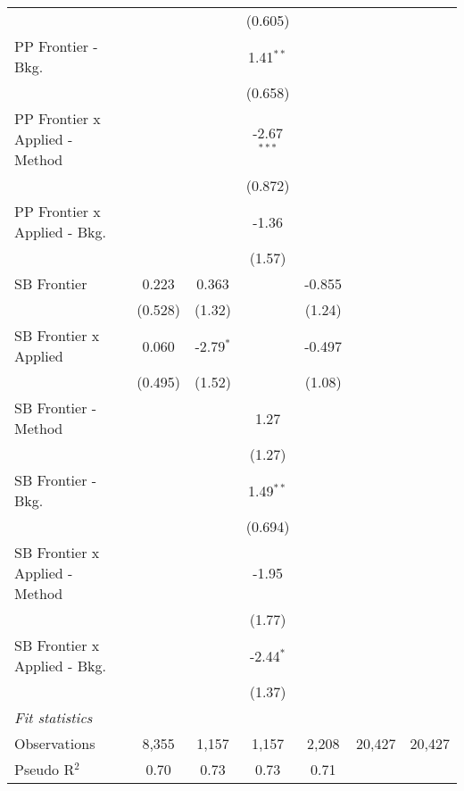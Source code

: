 \begin{tabular}{lcccccc}
                                  &              &               & (0.605)       &         &        &   \\   
   PP Frontier - Bkg.             &              &               & 1.41$^{**}$   &         &        &   \\   
                                  &              &               & (0.658)       &         &        &   \\   
   PP Frontier x Applied - Method &              &               & -2.67$^{***}$ &         &        &   \\   
                                  &              &               & (0.872)       &         &        &   \\   
   PP Frontier x Applied - Bkg.   &              &               & -1.36         &         &        &   \\   
                                  &              &               & (1.57)        &         &        &   \\   
   SB Frontier                    & 0.223        & 0.363         &               & -0.855  &        &   \\   
                                  & (0.528)      & (1.32)        &               & (1.24)  &        &   \\   
   SB Frontier x Applied          & 0.060        & -2.79$^{*}$   &               & -0.497  &        &   \\   
                                  & (0.495)      & (1.52)        &               & (1.08)  &        &   \\   
   SB Frontier - Method           &              &               & 1.27          &         &        &   \\   
                                  &              &               & (1.27)        &         &        &   \\   
   SB Frontier - Bkg.             &              &               & 1.49$^{**}$   &         &        &   \\   
                                  &              &               & (0.694)       &         &        &   \\   
   SB Frontier x Applied - Method &              &               & -1.95         &         &        &   \\   
                                  &              &               & (1.77)        &         &        &   \\   
   SB Frontier x Applied - Bkg.   &              &               & -2.44$^{*}$   &         &        &   \\   
                                  &              &               & (1.37)        &         &        &   \\   
   \midrule
   \emph{Fit statistics}\\
   Observations                   & 8,355        & 1,157         & 1,157         & 2,208   & 20,427 & 20,427\\  
   Pseudo R$^2$                   & 0.70         & 0.73          & 0.73          & 0.71    &        & \\  
   

\end{tabular}
